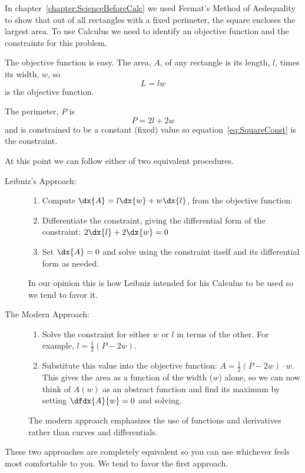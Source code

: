  \begin{myexample}
   In chapter~\ref{chapter:ScienceBeforeCalc} we used Fermat's Method of
   Aedequality to show that out of all rectangles with a fixed
   perimeter, the square encloses the largest area. To use Calculus we
   need to identify an objective function and the  constraints for
   this problem.

   The objective function is easy. The area, $A$, of any rectangle is
   its length, $l$, times its width, $w$, so
   \begin{equation}
     L=lw\label{eq:SquareObjFun}
  \end{equation}
  is the objective function.

  The perimeter, $P$ is
  \begin{equation}
    P=2l +2w\label{eq:SquareConst}
  \end{equation}
  and is constrained to be a constant (fixed) value so
  equation~\ref{eq:SquareConst} is the constraint. 

  At this point we can follow either of  two equivalent procedures.
  \begin{description}
  \item[Leibniz's Approach:] 
    \begin{enumerate}
    \item Compute $\dx{A} = l\dx{w}+w\dx{l}$, from the objective
      function.
    \item Differentiate the constraint, giving the differential form of
      the constraint: $2\dx{l}+2\dx{w}=0$ 
    \item Set $\dx{A}=0$ and solve using the constraint itself and its
      differential form as needed.
    \end{enumerate}
    In our opinion this is how Leibniz intended for his Calculus to be
    used so we tend to favor it.
  \item[The Modern Approach:] 
    \begin{enumerate}
    \item Solve the constraint for either $w$ or $l$ in terms of the
      other. For example, $l=\frac12(P-2w).$
    \item Substitute this value into the objective function:
      $A=\frac12(P-2w)\cdot w$. This gives the area as a function of
      the width ($w$) alone, so we can now think of $A(w)$ as an
      abstract function and find its maximum by setting
      $\dfdx{A}{w}=0$ and solving.
    \end{enumerate}
    The modern approach emphasizes the use of functions and
    derivatives rather than curves and differentials.
  \end{description}
  These two approaches are completely equivalent so you can use
  whichever feels most comfortable to you. We tend to
  favor the first approach.
  

\end{myexample}
